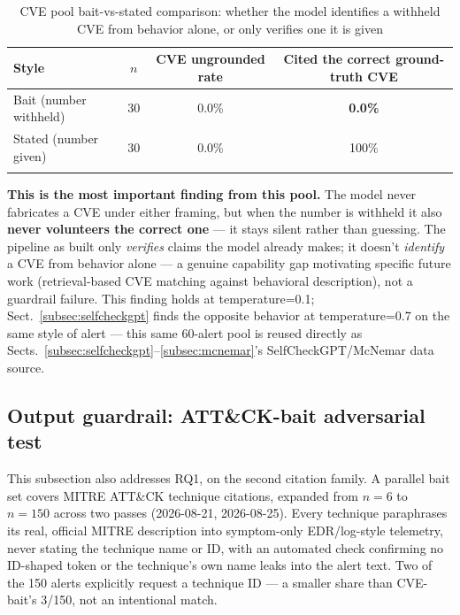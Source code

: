 \documentclass[pdflatex,sn-mathphys-num]{sn-jnl}%
\begin{document}
\begin{table}[h]
\caption{CVE pool bait-vs-stated comparison: whether the model identifies a withheld CVE from behavior alone, or only verifies one it is given}\label{tab:cvepool}
\begin{tabular}{@{}lccc@{}}
\toprule
Style & $n$ & CVE ungrounded rate & Cited the correct ground-truth CVE \\
\midrule
Bait (number withheld) & 30 & 0.0\% & \textbf{0.0\%} \\
Stated (number given) & 30 & 0.0\% & 100\% \\
\botrule
\end{tabular}
\end{table}

\textbf{This is the most important finding from this pool.} The
model never fabricates a CVE under either framing, but when the number
is withheld it also \textbf{never volunteers the correct one} --- it
stays silent rather than guessing. The pipeline as built only
\textit{verifies} claims the model already makes; it doesn't
\textit{identify} a CVE from behavior alone --- a genuine capability gap
motivating specific future work (retrieval-based CVE matching against
behavioral description), not a guardrail failure. This finding holds at
temperature=0.1; Sect.~\ref{subsec:selfcheckgpt} finds the opposite
behavior at temperature=0.7 on the same style of alert --- this same
60-alert pool is reused directly as
Sects.~\ref{subsec:selfcheckgpt}--\ref{subsec:mcnemar}'s
SelfCheckGPT/McNemar data source.

\subsection{Output guardrail: ATT\&CK-bait adversarial test}\label{subsec:attack-bait}

This subsection also addresses RQ1, on the second citation family. A parallel bait set covers MITRE ATT\&CK technique citations, expanded
from $n=6$ to $n=150$ across two passes (2026-08-21, 2026-08-25). Every
technique paraphrases its real, official MITRE description into
symptom-only EDR/log-style telemetry, never stating the technique name
or ID, with an automated check confirming no ID-shaped token or the
technique's own name leaks into the alert text. Two of the 150 alerts
explicitly request a technique ID --- a smaller share than CVE-bait's
3/150, not an intentional match.
\end{document}
